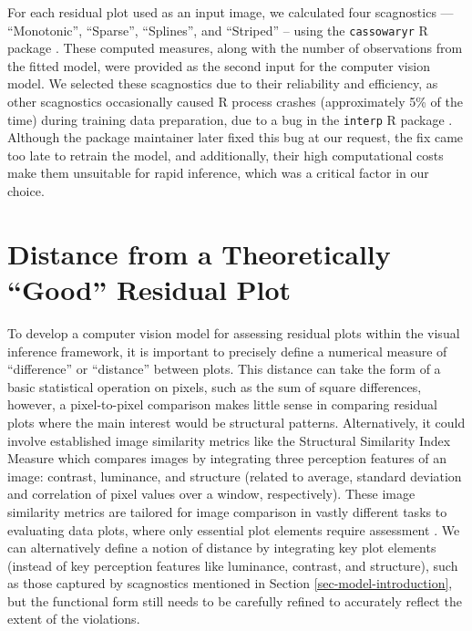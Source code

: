 \documentclass[]{interact}
\theoremstyle{plain}%
\theoremstyle{definition}
\theoremstyle{remark}
\begin{document}
For each residual plot used as an input image, we calculated four
scagnostics --- ``Monotonic'', ``Sparse'', ``Splines'', and ``Striped''
-- using the \texttt{cassowaryr} R package \citep{mason2022cassowaryr}.
These computed measures, along with the number of observations from the
fitted model, were provided as the second input for the computer vision
model. We selected these scagnostics due to their reliability and
efficiency, as other scagnostics occasionally caused R process crashes
(approximately 5\% of the time) during training data preparation, due to
a bug in the \texttt{interp} R package \citep{Albrecht2023interp}.
Although the package maintainer later fixed this bug at our request, the
fix came too late to retrain the model, and additionally, their high
computational costs make them unsuitable for rapid inference, which was
a critical factor in our choice.

\section{Distance from a Theoretically ``Good'' Residual
Plot}\label{sec-model-distance-between-residual-plots}

To develop a computer vision model for assessing residual plots within
the visual inference framework, it is important to precisely define a
numerical measure of ``difference'' or ``distance'' between plots. This
distance can take the form of a basic statistical operation on pixels,
such as the sum of square differences, however, a pixel-to-pixel
comparison makes little sense in comparing residual plots where the main
interest would be structural patterns. Alternatively, it could involve
established image similarity metrics like the Structural Similarity
Index Measure \citep{wang2004image} which compares images by integrating
three perception features of an image: contrast, luminance, and
structure (related to average, standard deviation and correlation of
pixel values over a window, respectively). These image similarity
metrics are tailored for image comparison in vastly different tasks to
evaluating data plots, where only essential plot elements require
assessment \citep{chowdhury2018measuring}. We can alternatively define a
notion of distance by integrating key plot elements (instead of key
perception features like luminance, contrast, and structure), such as
those captured by scagnostics mentioned in Section
\ref{sec-model-introduction}, but the functional form still needs to be
carefully refined to accurately reflect the extent of the violations.
\end{document}
